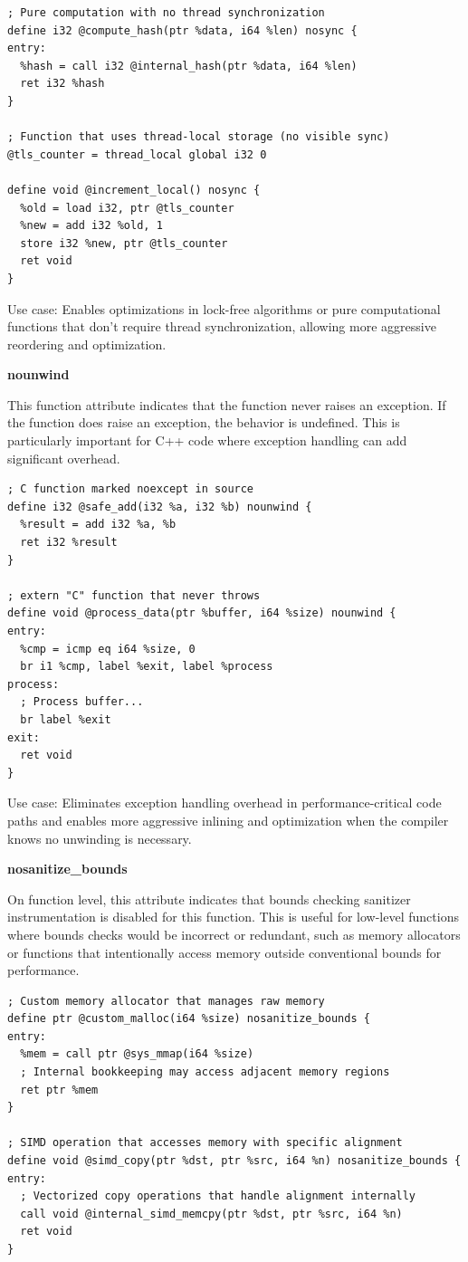 \begin{lstlisting}[style=ir]
; Pure computation with no thread synchronization
define i32 @compute_hash(ptr %data, i64 %len) nosync {
entry:
  %hash = call i32 @internal_hash(ptr %data, i64 %len)
  ret i32 %hash
}

; Function that uses thread-local storage (no visible sync)
@tls_counter = thread_local global i32 0

define void @increment_local() nosync {
  %old = load i32, ptr @tls_counter
  %new = add i32 %old, 1
  store i32 %new, ptr @tls_counter
  ret void
}
\end{lstlisting}

Use case: Enables optimizations in lock-free algorithms or pure computational functions that don't require thread synchronization, allowing more aggressive reordering and optimization.

\textbf{nounwind}

This function attribute indicates that the function never raises an exception. If the function does raise an exception, the behavior is undefined. This is particularly important for C++ code where exception handling can add significant overhead.

\begin{lstlisting}[style=ir]
; C function marked noexcept in source
define i32 @safe_add(i32 %a, i32 %b) nounwind {
  %result = add i32 %a, %b
  ret i32 %result
}

; extern "C" function that never throws
define void @process_data(ptr %buffer, i64 %size) nounwind {
entry:
  %cmp = icmp eq i64 %size, 0
  br i1 %cmp, label %exit, label %process
process:
  ; Process buffer...
  br label %exit
exit:
  ret void
}
\end{lstlisting}

Use case: Eliminates exception handling overhead in performance-critical code paths and enables more aggressive inlining and optimization when the compiler knows no unwinding is necessary.

\textbf{nosanitize\_bounds}

On function level, this attribute indicates that bounds checking sanitizer instrumentation is disabled for this function.
This is useful for low-level functions where bounds checks would be incorrect or redundant, such as memory allocators or functions that intentionally access memory outside conventional bounds for performance.

\begin{lstlisting}[style=ir]
; Custom memory allocator that manages raw memory
define ptr @custom_malloc(i64 %size) nosanitize_bounds {
entry:
  %mem = call ptr @sys_mmap(i64 %size)
  ; Internal bookkeeping may access adjacent memory regions
  ret ptr %mem
}

; SIMD operation that accesses memory with specific alignment
define void @simd_copy(ptr %dst, ptr %src, i64 %n) nosanitize_bounds {
entry:
  ; Vectorized copy operations that handle alignment internally
  call void @internal_simd_memcpy(ptr %dst, ptr %src, i64 %n)
  ret void
}
\end{lstlisting}

